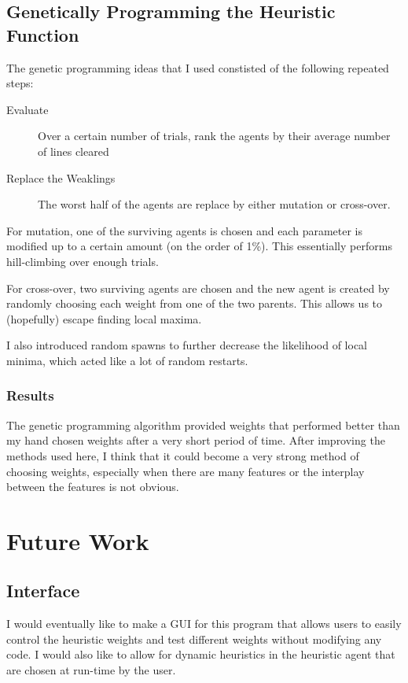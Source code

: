 \documentclass{article}
\begin{document}
\subsection{Genetically Programming the Heuristic Function}
The genetic programming ideas that I used constisted of the following repeated steps:

\begin{description}
  \item[Evaluate] Over a certain number of trials, rank the agents by their average number of lines cleared
  \item[Replace the Weaklings] The worst half of the agents are replace by either mutation or cross-over.
\end{description}

For mutation, one of the surviving agents is chosen and each parameter is modified up to a certain amount (on the order of 1\%). This essentially performs hill-climbing over enough trials.

For cross-over, two surviving agents are chosen and the new agent is created by randomly choosing each weight from one of the two parents. This allows us to (hopefully) escape finding local maxima.

I also introduced random spawns to further decrease the likelihood of local minima, which acted like a lot of random restarts.

\subsubsection{Results}
The genetic programming algorithm provided weights that performed better than my hand chosen weights after a very short period of time. After improving the methods used here, I think that it could become a very strong method of choosing weights, especially when there are many features or the interplay between the features is not obvious.

\section{Future Work}

\subsection{Interface}
I would eventually like to make a GUI for this program that allows users to easily control the heuristic weights and test different weights without modifying any code. I would also like to allow for dynamic heuristics in the heuristic agent that are chosen at run-time by the user.
\end{document}
